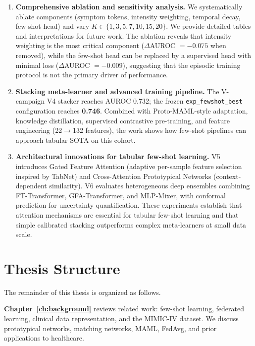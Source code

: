 \begin{enumerate}
\item \textbf{Comprehensive ablation and sensitivity analysis.} We systematically ablate components (symptom tokens, intensity weighting, temporal decay, few-shot head) and vary $K \in \{1,3,5,7,10,15,20\}$. We provide detailed tables and interpretations for future work. The ablation reveals that intensity weighting is the most critical component ($\Delta$AUROC $= -0.075$ when removed), while the few-shot head can be replaced by a supervised head with minimal loss ($\Delta$AUROC $= -0.009$), suggesting that the episodic training protocol is not the primary driver of performance.

\item \textbf{Stacking meta-learner and advanced training pipeline.} The V-campaign V4 stacker reaches AUROC 0.732; the frozen \texttt{exp\_fewshot\_best} configuration reaches \textbf{0.746}. Combined with Proto-MAML-style adaptation, knowledge distillation, supervised contrastive pre-training, and feature engineering (22$\to$132 features), the work shows how few-shot pipelines can approach tabular SOTA on this cohort.

\item \textbf{Architectural innovations for tabular few-shot learning.} V5 introduces Gated Feature Attention (adaptive per-sample feature selection inspired by TabNet) and Cross-Attention Prototypical Networks (context-dependent similarity). V6 evaluates heterogeneous deep ensembles combining FT-Transformer, GFA-Transformer, and MLP-Mixer, with conformal prediction for uncertainty quantification. These experiments establish that attention mechanisms are essential for tabular few-shot learning and that simple calibrated stacking outperforms complex meta-learners at small data scale.
\end{enumerate}

\section{Thesis Structure}

The remainder of this thesis is organized as follows.

\textbf{Chapter~\ref{ch:background}} reviews related work: few-shot learning, federated learning, clinical data representation, and the MIMIC-IV dataset. We discuss prototypical networks, matching networks, MAML, FedAvg, and prior applications to healthcare.


